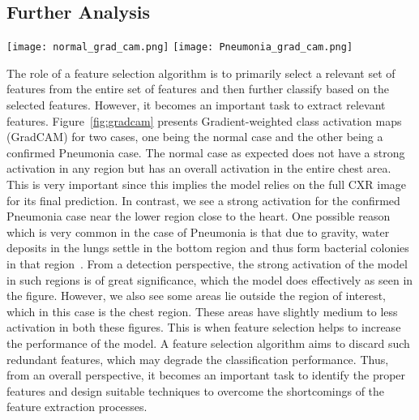 \documentclass[final,3p,times]{elsarticle}
\begin{document}
\subsection{Further Analysis}
\begin{figure*}[ht!]
    \centering
    \texttt{[image: normal\_grad\_cam.png]}
    \texttt{[image: Pneumonia\_grad\_cam.png]}
    \caption{GradCAM analysis on testing data. The upper figure shows the GradCAM analysis for a normal image with classification probability of 0.9875. The bottom image shows GradCAM analysis for a confirmed Pneumonia case with classification probability 0.9965. The GradCAMs are generated using the gradient maps in the final convolutional layer of the deep learner.}
    \label{fig:gradcam}
\end{figure*}
The role of a feature selection algorithm is to primarily select a relevant set of features from the entire set of features and then further classify based on the selected features. However, it becomes an important task to extract relevant features. Figure~\ref{fig:gradcam} presents Gradient-weighted class activation maps (GradCAM) for two {cases,} one being the normal case and the other being a confirmed Pneumonia case. The normal case as expected does not have a strong activation in any region but has an overall activation in the entire chest area. This is very important since this implies the model relies on the full CXR image for its final prediction. In contrast, we see a strong activation for the confirmed Pneumonia case near the lower region close to the heart. One possible reason which is very common in the case of Pneumonia is that due to {gravity,} water deposits in the lungs settle in the bottom region and thus form bacterial colonies in that region~\cite{aly2008randomized}. From a detection perspective, the strong activation of the model in such regions is of great {significance,} which the model does effectively as seen in the figure. However, we also see some areas lie outside the region of interest, which in this case is the chest region. {These} areas have {slightly medium to less} activation in both these figures. This is when feature selection helps to increase the performance of the model. A feature selection algorithm aims to discard such redundant features, which may degrade the classification performance. Thus, from an overall perspective, it becomes an important task to identify the proper features and design suitable techniques to overcome the shortcomings of the feature extraction processes.
\end{document}
